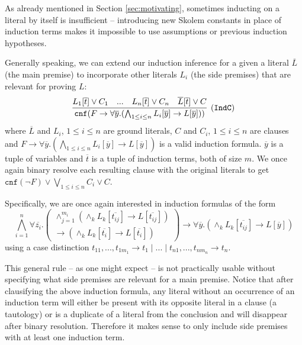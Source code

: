 
As already mentioned in Section \ref{sec:motivating}, sometimes inducting on a literal by itself is insufficient -- introducing new Skolem constants in place of induction terms makes it impossible to use assumptions or previous induction hypotheses.

Generally speaking, we can extend our induction inference for a given a literal $\overline{L}$ (the main premise) to incorporate other literals $L_i$ (the side premises) that are relevant for proving $L$:
\begin{equation*}\label{eq:multind}
\infer[\small{\tt (IndC)}]{\mathtt{cnf}(F \rightarrow \forall \overline{y}.(\bigwedge_{1\le i\le n}L_i[\overline{y}]\rightarrow L[\overline{y}]))}{L_1[\overline{t}]\lor C_1\quad...\quad L_n[\overline{t}]\lor C_n\quad\overline{L}[\overline{t}] \lor C}
\end{equation*}
where $\overline{L}$ and $L_i$, $1\le i\le n$ are ground literals, $C$ and $C_i$, $1\le i\le n$ are clauses and $F \rightarrow \forall \overline{y}.(\bigwedge_{1\le i\le n}L_i[\overline{y}]\rightarrow L[\overline{y}])$ is a valid induction formula. $\overline{y}$ is a tuple of variables and $\overline{t}$ is a tuple of induction terms, both of size $m$. We once again binary resolve each resulting clause with the original literals to get $\mathtt{cnf}(\lnot F) \lor\bigvee_{1\le i\le n} C_i\lor C$.

Specifically, we are once again interested in induction formulas of the form
$$\bigwedge_{i=1}^{n}\forall \overline{z_i}.\begin{pmatrix}\wedge_{j=1}^{m_i}(\wedge_kL_k[\overline{t_{ij}}]\rightarrow L[\overline{t_{ij}}])\\\rightarrow (\wedge_kL_k[\overline{t_i}]\rightarrow L[\overline{t_i}])\end{pmatrix}\rightarrow \forall \overline{y}.(\wedge_kL_k[\overline{t_{ij}}]\rightarrow L[\overline{y}])$$
using a case distinction $t_{11},...,t_{1{m_1}}\rightarrow t_1\mid...\mid t_{n1},...,t_{n{m_n}}\rightarrow t_n$.

This general rule -- as one might expect -- is not practically usable without specifying what side premises are relevant for a main premise. Notice that after clausifying the above induction formula, any literal without an occurrence of an induction term will either be present with its opposite literal in a clause (a tautology) or is a duplicate of a literal from the conclusion and will disappear after binary resolution. Therefore it makes sense to only include side premises with at least one induction term.

